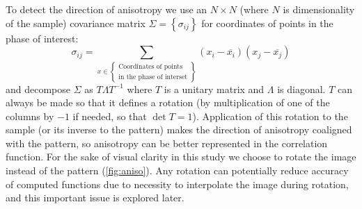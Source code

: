 \documentclass[reprint,amsmath,amssymb,aps,pre,showkeys,showpacs]{revtex4-1}
\begin{document}
To detect the direction of anisotropy we use an $N \times N$ (where $N$ is
dimensionality of the sample) covariance matrix
$\Sigma = \left\{ \sigma_{ij} \right\}$ for coordinates of points in the phase of
interest:
\begin{equation}
  \sigma_{ij} = \sum_{x \in \left\{
    \begin{array}{l}
      \text{Coordinates of points} \\
      \text{in the phase of interset}
    \end{array}
    \right\}} (x_i - \overline{x_i})(x_j - \overline{x_j})
\end{equation}
and decompose $\Sigma$ as $T \Lambda T^{-1}$ where $T$ is a unitary matrix and
$\Lambda$ is diagonal. $T$ can always be made so that it defines a rotation (by
multiplication of one of the columns by $-1$ if needed, so that
$\det T = 1$). Application of this rotation to the sample (or its inverse to the
pattern) makes the direction of anisotropy coaligned with the pattern, so
anisotropy can be better represented in the correlation function. For the sake
of visual clarity in this study we choose to rotate the image instead of the
pattern (\cref{fig:aniso}). Any rotation can potentially reduce accuracy of
computed functions due to necessity to interpolate the image during
rotation, and this important issue is explored later.
\end{document}
